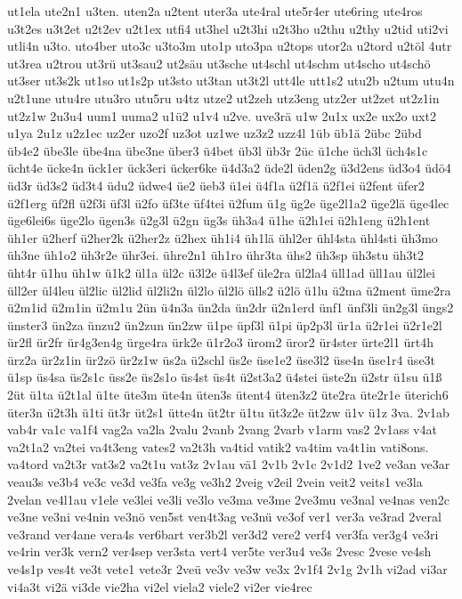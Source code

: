 {ut1ela
ute2n1
u3ten.
uten2a
u2tent
uter3a
ute4ral
ute5r4er
ute6ring
ute4ros
u3t2es
u3t2et
u2t2ev
u2t1ex
utfi4
ut3hel
u2t3hi
u2t3ho
u2thu
u2thy
u2tid
uti2vi
utli4n
u3to.
uto4ber
uto3c
u3to3m
uto1p
uto3pa
u2tops
utor2a
u2tord
u2töl
4utr
ut3rea
u2trou
ut3rü
ut3sau2
ut2säu
ut3sche
ut4schl
ut4schm
ut4scho
ut4schö
ut3ser
ut3s2k
ut1so
ut1s2p
ut3sto
ut3tan
ut3t2l
utt4le
utt1s2
utu2b
u2tum
utu4n
u2t1une
utu4re
utu3ro
utu5ru
u4tz
utze2
ut2zeh
utz3eng
utz2er
ut2zet
ut2z1in
ut2z1w
2u3u4
uum1
uuma2
u1ü2
u1v4
u2ve.
uve3rä
u1w
2u1x
ux2e
ux2o
uxt2
u1ya
2u1z
u2z1ec
uz2er
uzo2f
uz3ot
uz1we
uz3z2
uzz4l
1üb
üb1ä
2übc
2übd
üb4e2
übe3le
übe4na
übe3ne
über3
ü4bet
üb3l
üb3r
2üc
ü1che
üch3l
üch4s1c
ücht4e
ücke4n
ück1er
ück3eri
ücker6ke
ü4d3a2
üde2l
üden2g
ü3d2ens
üd3o4
üdö4
üd3r
üd3s2
üd3t4
üdu2
üdwe4
üe2
üeb3
ü1ei
ü4f1a
ü2f1ä
ü2f1ei
ü2fent
üfer2
ü2f1erg
üf2fl
ü2f3i
üf3l
ü2fo
üf3te
üf4tei
ü2fum
ü1g
üg2e
üge2l1a2
üge2lä
üge4lec
üge6lei6s
üge2lo
ügen3s
ü2g3l
ü2gn
üg3s
üh3a4
ü1he
ü2h1ei
ü2h1eng
ü2h1ent
üh1er
ü2herf
ü2her2k
ü2her2z
ü2hex
üh1i4
üh1lä
ühl2er
ühl4sta
ühl4sti
üh3mo
üh3ne
üh1o2
üh3r2e
ühr3ei.
ühre2n1
üh1ro
ühr3ta
ühs2
üh3sp
üh3stu
üh3t2
üht4r
ü1hu
üh1w
ü1k2
ül1a
ül2c
ü3l2e
ü4l3ef
üle2ra
ül2la4
üll1ad
üll1au
ül2lei
üll2er
ül4leu
ül2lic
ül2lid
ül2li2n
ül2lo
ül2lö
ülls2
ü2lö
ü1lu
ü2ma
ü2ment
üme2ra
ü2m1id
ü2m1in
ü2m1u
2ün
ü4n3a
ün2da
ün2dr
ü2n1erd
ünf1
ünf3li
ün2g3l
üngs2
ünster3
ün2za
ünzu2
ün2zun
ün2zw
ü1pe
üpf3l
ü1pi
üp2p3l
ür1a
ü2r1ei
ü2r1e2l
ür2fl
ür2fr
ür4g3en4g
ürge4ra
ürk2e
ü1r2o3
ürom2
üror2
ür4ster
ürte2l1
ürt4h
ürz2a
ür2z1in
ür2zö
ür2z1w
üs2a
ü2schl
üs2e
üse1e2
üse3l2
üse4n
üse1r4
üse3t
ü1sp
üs4sa
üs2s1c
üss2e
üs2s1o
üs4st
üs4t
ü2st3a2
ü4stei
üste2n
ü2str
ü1su
ü1ß
2üt
ü1ta
ü2t1al
ü1te
üte3m
üte4n
üten3s
ütent4
üten3z2
üte2ra
üte2r1e
üterich6
üter3n
ü2t3h
ü1ti
üt3r
üt2s1
ütte4n
üt2tr
ü1tu
üt3z2e
üt2zw
ü1v
ü1z
3va.
2v1ab
vab4r
va1c
va1f4
vag2a
va2la
2valu
2vanb
2vang
2varb
v1arm
vas2
2v1ass
v4at
va2t1a2
va2tei
va4t3eng
vates2
va2t3h
va4tid
vatik2
va4tim
va4t1in
vati8ons.
va4tord
va2t3r
vat3s2
va2t1u
vat3z
2v1au
vä1
2v1b
2v1c
2v1d2
1ve2
ve3an
ve3ar
veau3s
ve3b4
ve3c
ve3d
ve3fa
ve3g
ve3h2
2veig
v2eil
2vein
veit2
veits1
ve3la
2velan
ve4l1au
v1ele
ve3lei
ve3li
ve3lo
ve3ma
ve3me
2ve3mu
ve3nal
ve4nas
ven2c
ve3ne
ve3ni
ve4nin
ve3nö
ven5st
ven4t3ag
ve3nü
ve3of
ver1
ver3a
ve3rad
2veral
ve3rand
ver4ane
vera4s
ver6bart
ver3b2l
ver3d2
vere2
verf4
ver3fa
ver3g4
ve3ri
ve4rin
ver3k
vern2
ver4sep
ver3sta
vert4
ver5te
ver3u4
ve3s
2vesc
2vese
ve4sh
ve4s1p
ves4t
ve3t
vete1
vete3r
2veü
ve3v
ve3w
ve3x
2v1f4
2v1g
2v1h
vi2ad
vi3ar
vi4a3t
vi2ä
vi3de
vie2ha
vi2el
viela2
viele2
vi2er
vie4rec
}
